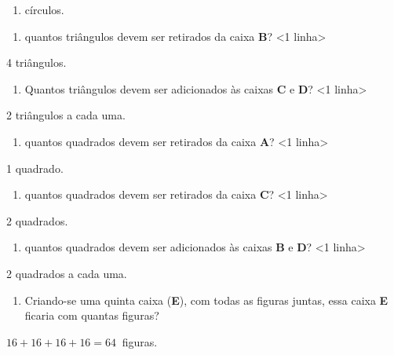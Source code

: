 \begin{enumerate}
\def\labelenumi{\arabic{enumi}.}
\setcounter{enumi}{3}
\item
  círculos.
\end{enumerate}

\begin{enumerate}
\def\labelenumi{\Alph{enumi})}
\item
  quantos triângulos devem ser retirados da caixa \textbf{B}? \textless{}1
  linha\textgreater{}
\end{enumerate}

4 triângulos.

\begin{enumerate}
\def\labelenumi{\Alph{enumi})}
\item
  Quantos triângulos devem ser adicionados às caixas \textbf{C} e
  \textbf{D}? \textless{}1 linha\textgreater{}
\end{enumerate}

2 triângulos a cada uma.

\begin{enumerate}
\def\labelenumi{\Alph{enumi})}
\item
  quantos quadrados devem ser retirados da caixa \textbf{A}? \textless{}1
  linha\textgreater{}
\end{enumerate}

1 quadrado.

\begin{enumerate}
\def\labelenumi{\Alph{enumi})}
\item
  quantos quadrados devem ser retirados da caixa \textbf{C}? \textless{}1
  linha\textgreater{}
\end{enumerate}

2 quadrados.

\begin{enumerate}
\def\labelenumi{\Alph{enumi})}
\item
  quantos quadrados devem ser adicionados às caixas \textbf{B} e
  \textbf{D}? \textless{}1 linha\textgreater{}
\end{enumerate}

2 quadrados a cada uma.

\begin{enumerate}
\def\labelenumi{\Alph{enumi})}
\item
  Criando-se uma quinta caixa (\textbf{E}), com todas as figuras juntas, essa caixa \textbf{E} ficaria com quantas figuras?
\end{enumerate}

\(16 + 16 + 16 + 16 = 64\ \) figuras.

